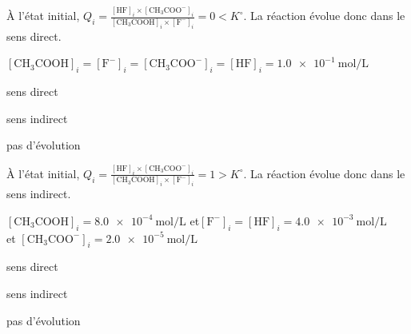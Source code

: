 \reponse{\reponseA}

\begin{corrige}
À l'état initial, $Q_i=\frac{\left[\text{HF}\right]_i\times\left[\text{CH}_3\text{COO}^-\right]_i}{\left[\text{CH}_3\text{COOH}\right]_i\times\left[\text{F}^-\right]_i}=0<K^\circ$. La réaction évolue donc dans le sens direct.
\end{corrige}




\begin{enonce}
$\left[\text{CH}_3\text{COOH}\right]_i=
\left[\text{F}^-\right]_i = 
\left[\text{CH}_3\text{COO}^-\right]_i=
\left[\text{HF}\right]_i=\SI{1,0e-1}{\mole\per\liter}
$
\begin{listeQCM2Colonnes}
	\item sens direct
	\item sens indirect
	\item pas d'évolution
\end{listeQCM2Colonnes}
\end{enonce}


\reponse{\reponseB}

\begin{corrige}
À l'état initial, $Q_i=\frac{\left[\text{HF}\right]_i\times\left[\text{CH}_3\text{COO}^-\right]_i}{\left[\text{CH}_3\text{COOH}\right]_i\times\left[\text{F}^-\right]_i}=1>K^\circ$. La réaction évolue donc dans le sens indirect.
\end{corrige}




\begin{enonce}
$\left[\text{CH}_3\text{COOH}\right]_i=\SI{8,0e-4}{\mole\per\liter}$  \qquad et\qquad  $\left[\text{F}^-\right]_i=
\left[\text{HF}\right]_i=\SI{4,0e-3}{\mole\per\liter}$ \\ 
et $\left[\text{CH}_3\text{COO}^-\right]_i=\SI{2,0e-5}{\mole\per\liter}$ 

\begin{listeQCM2Colonnes}
	\item sens direct
	\item sens indirect
	\item pas d'évolution
\end{listeQCM2Colonnes}
\end{enonce}

